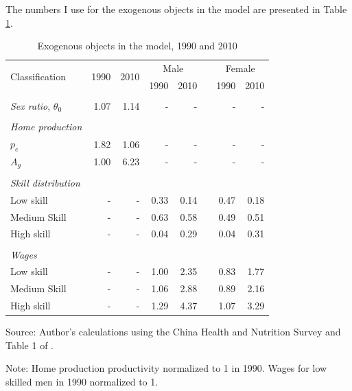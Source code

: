 \documentclass[12pt]{article}
\newcommand{\source}[1]{\caption*{Source: {#1}} }
\newcommand{\note}[1]{\caption*{Note: {#1}} }
\begin{document}
The numbers I use for the exogenous objects in the model are presented in Table \ref{tab:exogenous_obj}.

\begin{table}[]
	\centering
	\caption{Exogenous objects in the model, 1990 and 2010}
	\begin{tabular}{lrrrrrrr}
		\toprule
		\multirow{2}[4]{*}{Classification} & \multicolumn{1}{c}{\multirow{2}[4]{*}{1990}} & \multicolumn{1}{c}{\multirow{2}[4]{*}{2010}} & \multicolumn{2}{c}{Male} &       & \multicolumn{2}{c}{Female} \\
		\cmidrule{4-5}\cmidrule{7-8}      &       &       & 1990  & 2010  &       & 1990  & 2010 \\
		\midrule
		&       &       &       &       &       &       &  \\
		\textit{Sex ratio}, $\theta_0$ & 1.07  & 1.14  & -     & -     &       & -     & - \\
		&       &       &       &       &       &       &  \\
		\textit{Home production} &       &       &       &       &       &       &  \\
		$p_e$ & 1.82  & 1.06  & -     & -     &       & -     & - \\
		\textit{$A_g$} & 1.00  & 6.23  & -     & -     &       & -     & - \\
		&       &       &       &       &       &       &  \\
		\textit{Skill distribution} &       &       &       &       &       &       &  \\
		Low skill & -     & -     & 0.33  & 0.14  &       & 0.47  & 0.18 \\
		Medium Skill & -     & -     & 0.63  & 0.58  &       & 0.49  & 0.51 \\
		High skill & -     & -     & 0.04  & 0.29  &       & 0.04  & 0.31 \\
		&       &       &       &       &       &       &  \\
		\textit{Wages} &       &       &       &       &       &       &  \\
		Low skill & -     & -     & 1.00  & 2.35  &       & 0.83  & 1.77 \\
		Medium Skill & -     & -     & 1.06  & 2.88  &       & 0.89  & 2.16 \\
		High skill & -     & -     & 1.29  & 4.37  &       & 1.07  & 3.29 \\
		\bottomrule
		\bottomrule
	\end{tabular}
	\label{tab:exogenous_obj}
	\source{Author's calculations using the China Health and Nutrition Survey and Table 1 of \cite{getao14}.}
	\note{Home production productivity normalized to 1 in 1990. Wages for low skilled men in 1990 normalized to 1.}
\end{table}
\end{document}
